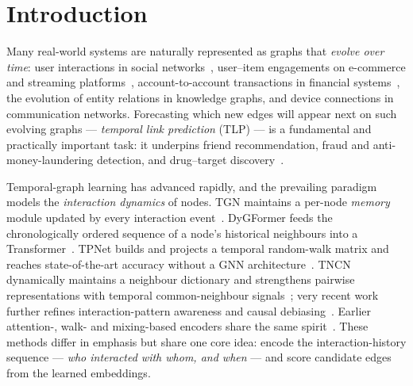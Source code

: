 \documentclass[sigconf,nonacm,review]{acmart}
\begin{document}

\maketitle

\section{Introduction}
\label{sec:intro}

Many real-world systems are naturally represented as graphs that \emph{evolve
over time}: user interactions in social networks~\cite{trivedi2019dyrep},
user--item engagements on e-commerce and streaming
platforms~\cite{kumar2019jodie}, account-to-account transactions in financial
systems~\cite{huang2023tgb}, the evolution of entity relations in knowledge
graphs, and device connections in communication networks. Forecasting which new
edges will appear next on such evolving graphs --- \emph{temporal link
prediction} (TLP) --- is a fundamental and practically important task: it
underpins friend recommendation, fraud and anti-money-laundering detection, and
drug--target discovery~\cite{poursafaei2022edgebank,huang2023tgb}.

Temporal-graph learning has advanced rapidly, and the prevailing paradigm
models the \emph{interaction dynamics} of nodes. TGN maintains a per-node
\emph{memory} module updated by every interaction event~\cite{rossi2020tgn}.
DyGFormer feeds the chronologically ordered sequence of a node's historical
neighbours into a Transformer~\cite{yu2023dygformer}. TPNet builds and projects
a temporal random-walk matrix and reaches state-of-the-art accuracy without a
GNN architecture~\cite{lu2024tpnet}. TNCN dynamically maintains a neighbour
dictionary and strengthens pairwise representations with temporal
common-neighbour signals~\cite{zhang2024tncn}; very recent work further refines
interaction-pattern awareness and causal
debiasing~\cite{zhang2025ipnet,zhang2025tide}. Earlier attention-, walk- and
mixing-based encoders share the same
spirit~\cite{xu2020tgat,wang2021cawn,cong2023graphmixer}. These methods differ
in emphasis but share one core idea: encode the interaction-history sequence
--- \emph{who interacted with whom, and when} --- and score candidate edges
from the learned embeddings.
\end{document}
